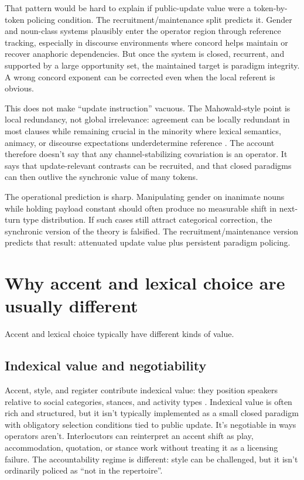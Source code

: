 \documentclass[12pt,letterpaper]{article}
\begin{document}
That pattern would be hard to explain if public-update value were a token-by-token policing condition. The recruitment/maintenance split predicts it. Gender and noun-class systems plausibly enter the operator region through reference tracking, especially in discourse environments where concord helps maintain or recover anaphoric dependencies. But once the system is closed, recurrent, and supported by a large opportunity set, the maintained target is paradigm integrity. A wrong concord exponent can be corrected even when the local referent is obvious.

This does not make \enquote{update instruction} vacuous. The Mahowald-style point is local redundancy, not global irrelevance: agreement can be locally redundant in most clauses while remaining crucial in the minority where lexical semantics, animacy, or discourse expectations underdetermine reference \citep{mahowaldetal2023}. The account therefore doesn't say that any channel-stabilizing covariation is an operator. It says that update-relevant contrasts can be recruited, and that closed paradigms can then outlive the synchronic value of many tokens.

The operational prediction is sharp. Manipulating gender on inanimate nouns while holding payload constant should often produce no measurable shift in next-turn type distribution. If such cases still attract categorical correction, the synchronic version of the theory is falsified. The recruitment/maintenance version predicts that result: attenuated update value plus persistent paradigm policing.

\section{Why accent and lexical choice are usually different}

Accent and lexical choice typically have different kinds of value.

\subsection{Indexical value and negotiability}

Accent, style, and register contribute indexical value: they position speakers relative to social categories, stances, and activity types \citep{silverstein1976,eckert2008,agha2007,coupland2007}. Indexical value is often rich and structured, but it isn't typically implemented as a small closed paradigm with obligatory selection conditions tied to public update. It's negotiable in ways operators aren't. Interlocutors can reinterpret an accent shift as play, accommodation, quotation, or stance work without treating it as a licensing failure. The accountability regime is different: style can be challenged, but it isn't ordinarily policed as \enquote{not in the repertoire}.
\end{document}
